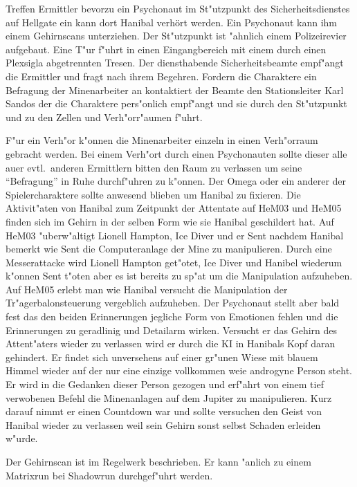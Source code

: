 
Treffen Ermittler bevorzu ein Psychonaut im St"utzpunkt des Sicherheitsdienstes auf Hellgate ein kann dort Hanibal verhört werden. Ein Psychonaut kann ihm einem Gehirnscans unterziehen. Der St"utzpunkt ist "ahnlich einem Polizeirevier aufgebaut. Eine T"ur f"uhrt in einen Eingangbereich mit einem durch einen Plexsigla\3 abgetrennten Tresen. Der diensthabende Sicherheitsbeamte empf"angt die Ermittler und fragt nach ihrem Begehren. Fordern die Charaktere ein Befragung der Minenarbeiter an kontaktiert der Beamte den Stationsleiter Karl Sandos der die Charaktere pers"onlich empf"angt und sie durch den St"utzpunkt und zu den Zellen und Verh"orr"aumen f"uhrt.

F"ur ein Verh"or k"onnen die Minenarbeiter einzeln in einen Verh"orraum gebracht werden. Bei einem Verh"ort durch einen Psychonauten sollte dieser alle au\3er evtl.~anderen Ermittlern bitten den Raum zu verlassen um seine "`Befragung"' in Ruhe durchf"uhren zu k"onnen. Der Omega oder ein anderer der Spielercharaktere sollte anwesend blieben um Hanibal zu fixieren. Die Aktivit"aten von Hanibal zum Zeitpunkt der Attentate auf HeM03 und HeM05 finden sich im Gehirn in der selben Form wie sie Hanibal geschildert hat. Auf HeM03 "uberw"altigt Lionell Hampton, Ice Diver und er Sent nachdem Hanibal bemerkt wie Sent die Computeranlage der Mine zu manipulieren. Durch eine Messerattacke wird Lionell Hampton get"otet, Ice Diver und Hanibel wiederum k"onnen Sent t"oten aber es ist bereits zu sp"at um die Manipulation aufzuheben. Auf HeM05 erlebt man wie Hanibal versucht die Manipulation der Tr"agerbalonsteuerung vergeblich aufzuheben. Der Psychonaut stellt aber bald fest das den beiden Erinnerungen jegliche Form von Emotionen fehlen und die Erinnerungen zu geradlinig und Detailarm wirken. Versucht er das Gehirn des Attent"aters wieder zu verlassen wird er durch die KI in Hanibals Kopf daran gehindert. Er findet sich unversehens auf einer gr"unen Wiese mit blauem Himmel wieder auf der nur eine einzige vollkommen wei\3e androgyne Person steht. Er wird in die Gedanken dieser Person gezogen und erf"ahrt von einem tief verwobenen Befehl die Minenanlagen auf dem Jupiter zu manipulieren. Kurz darauf nimmt er einen Countdown war und sollte versuchen den Geist von Hanibal wieder zu verlassen weil sein Gehirn sonst selbst Schaden erleiden w"urde.

\begin{remarks}
	Der Gehirnscan ist im Regelwerk beschrieben. Er kann "anlich zu einem Matrixrun bei Shadowrun durchgef"uhrt werden.
\end{remarks}

